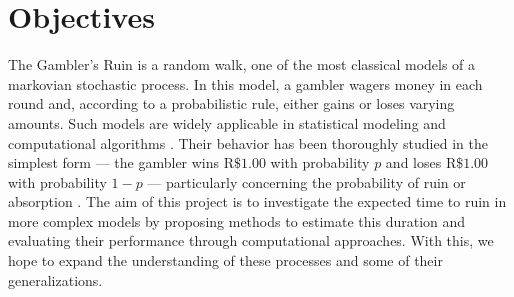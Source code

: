 \documentclass[a4paper,10pt,twocolumn]{article}
\begin{document}
\pagestyle{fancy}
\fancyhead{}
\renewcommand{\headrulewidth}{0pt}


\section{Objectives}

The Gambler’s Ruin is a random walk, one of the most classical models of a
markovian stochastic process. In this model, a gambler wagers money in each
round and, according to a probabilistic rule, either gains or loses varying
amounts. Such models are widely applicable in statistical modeling and
computational algorithms \cite{ross_markov_2019}. Their behavior has been
thoroughly studied in the simplest form — the gambler wins $\mathrm{R}\$1.00$
with probability $p$ and loses $\mathrm{R}\$1.00$ with probability $1-p$ —
particularly concerning the probability of ruin or absorption
\cite{ross_introduction_2019}. The aim of this project is to investigate the
expected time to ruin in more complex models by proposing methods to estimate
this duration and evaluating their performance through computational approaches.
With this, we hope to expand the understanding of these processes and some of
their generalizations.
\end{document}
